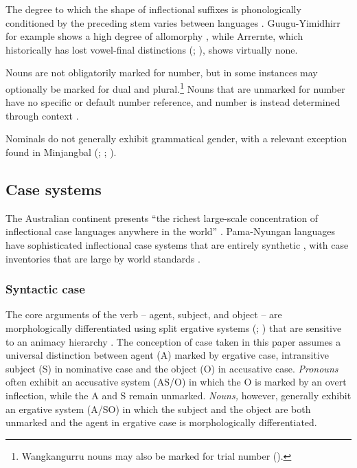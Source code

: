 The degree to which the shape of inflectional suffixes is phonologically conditioned by the preceding stem varies between languages \citep{baker_word_2014}. Guugu{\hyp}Yimidhirr for example shows a high degree of allomorphy \citep[43--47]{haviland_guugu_1979}, while Arrernte, which historically has lost vowel-final distinctions (\citealt{breen_wonders_2001}; \citealt{koch_pama-nyungan_1997}), shows virtually none.

Nouns are not obligatorily marked for number, but in some instances may optionally be marked for dual and plural.\footnote{ Wangkangurru nouns may also be marked for trial number (\citealt[64]{hercus_grammar_1994}). }  Nouns that are unmarked for number have no specific or default number reference, and number is instead determined through context \citep[77]{dixon_australian_2002}.

Nominals do not generally exhibit grammatical gender, with a relevant exception found in Minjangbal (\citealt{livingstone_grammar_1892}; \citealt{crowley_middle_1978}; ).

\subsection{Case systems}
\label{sec:key:1.2.2}

The Australian continent presents “the richest large-scale concentration of inflectional case languages anywhere in the world” \citep[xv--xvi]{blake_case_2001}. Pama-Nyungan languages have sophisticated inflectional case systems that are entirely synthetic \citep[9]{blake_case_2001}, with case inventories that are large by world standards \citep{iggesen_number_2013}. 

\subsubsection{Syntactic case}
\label{sec:key:1.2.2.1}

The core arguments of the verb – agent, subject, and object – are morphologically differentiated using split ergative systems (\citealt[6]{blake_case_1977}; \citealt[72]{dixon_preface_2002}) that are sensitive to an animacy hierarchy \citep{silverstein_hierarchy_1976}. The conception of case taken in this paper assumes a universal distinction between agent (A) marked by ergative case, intransitive subject (S) in nominative case and the object (O) in accusative case. \textit{Pronouns} often exhibit an accusative system (AS/O) in which the O is marked by an overt inflection, while the A and S remain unmarked. \textit{Nouns,} however, generally exhibit an ergative system (A/SO) in which the subject and the object are both unmarked and the agent in ergative case is morphologically differentiated. 

